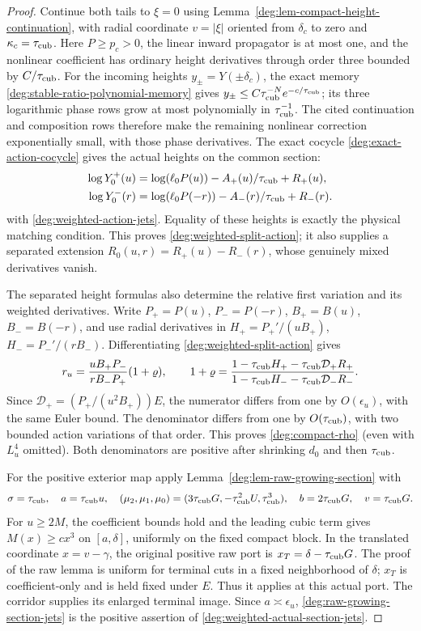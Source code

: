 \begin{proof}
Continue both tails to \(\xi=0\) using
Lemma~\ref{deg:lem-compact-height-continuation}, with radial coordinate
\(v=|\xi|\) oriented from \(\delta_c\) to zero and
\(\kappa_c=\tau_{\rm cub}\). Here \(P\ge p_c>0\), the linear inward
propagator is at most one, and the nonlinear coefficient has ordinary
height derivatives through order three bounded by \(C/\tau_{\rm cub}\).
For the incoming heights \(y_\pm=Y(\pm\delta_c)\), the exact memory
\eqref{deg:stable-ratio-polynomial-memory} gives
\(y_\pm\le C\tau_{\rm cub}^{-N}e^{-c/\tau_{\rm cub}}\); its three
logarithmic phase rows grow at most polynomially in \(\tau_{\rm cub}^{-1}\).
The cited continuation and composition rows therefore make the remaining
nonlinear correction exponentially small, with those phase derivatives.
The exact cocycle \eqref{deg:exact-action-cocycle} gives the actual
heights on the common section:
\begin{align*}
 \log Y_0^+(u)&=\log(\ell_0P(u))-A_+(u)/\tau_{\rm cub}+R_+(u),\\
 \log Y_0^-(r)&=\log(\ell_0P(-r))-A_-(r)/\tau_{\rm cub}+R_-(r).
\end{align*}
with \eqref{deg:weighted-action-jets}.  Equality of these heights is
exactly the physical matching condition.  This proves
\eqref{deg:weighted-split-action}; it also supplies a separated extension
\(R_0(u,r)=R_+(u)-R_-(r)\), whose genuinely mixed derivatives vanish.

The separated height formulas also determine the relative first
variation and its weighted derivatives. Write
\(P_+=P(u)\), \(P_-=P(-r)\), \(B_+=B(u)\), \(B_-=B(-r)\),
and use radial derivatives in
\(H_+=P_+'/(uB_+)\), \(H_-=P_-'/(rB_-)\).
Differentiating \eqref{deg:weighted-split-action} gives
\begin{equation}
 r_u=\frac{uB_+P_-}{rB_-P_+}(1+\varrho),\qquad
 1+\varrho=
 \frac{1-\tau_{\rm cub} H_+-\tau_{\rm cub}\mathcal D_+R_+}
      {1-\tau_{\rm cub} H_--\tau_{\rm cub}\mathcal D_-R_-}.
 \label{deg:weighted-relative-variation}
\end{equation}
Since \(\mathcal D_+=(P_+/(u^2B_+))E\), the numerator differs
from one by \(O(\epsilon_u)\), with the same Euler bound.  The
denominator differs from one by \(O(\tau_{\rm cub})\), with two bounded action
variations of that order.  This proves \eqref{deg:compact-rho} (even
with \(L_u^4\) omitted).  Both denominators are positive after shrinking
\(d_0\) and then \(\tau_{\rm cub}\).

For the positive exterior map apply
Lemma~\ref{deg:lem-raw-growing-section} with
\[
 \sigma=\tau_{\rm cub},\quad a=\tau_{\rm cub} u,\quad
 (\mu_2,\mu_1,\mu_0)=(3\tau_{\rm cub} G,-\tau_{\rm cub}^2U,\tau_{\rm cub}^3),
 \quad b=2\tau_{\rm cub} G,\quad v=\tau_{\rm cub} G.
\]
For \(u\ge2M\), the coefficient bounds hold and the leading cubic
term gives \(M(x)\ge c x^3\) on \([a,\delta]\), uniformly on the
fixed compact block. In the translated coordinate \(x=v-\gamma\),
the original positive raw port is \(x_T=\delta-\tau_{\rm cub} G\).
The proof of the raw lemma is uniform for terminal cuts in a fixed
neighborhood of \(\delta\); \(x_T\) is coefficient-only and is held
fixed under \(E\). Thus it applies at this actual port. The corridor
supplies its enlarged terminal image.
Since \(a\asymp\epsilon_u\), \eqref{deg:raw-growing-section-jets}
is the positive assertion of \eqref{deg:weighted-actual-section-jets}.


\end{proof}
